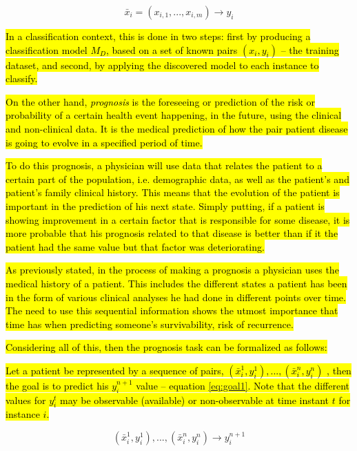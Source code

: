 \begin{equation}
	\bar{x}_i = (x_{i,1},... ,x_{i,m}) \rightarrow y_i
\label{eq:classification}
\end{equation}


\hl{In a classification context, this is done in two steps: first by producing a classification model $M_D$, based on a set of known
 pairs $(x_i, y_i)$ – the training dataset, and second, by applying the discovered model to each instance to classify.}

\hl{On the other hand, \emph{prognosis} is the foreseeing or prediction of the risk or probability of a certain health event happening,
 in the future, using the clinical and non-clinical data. It is the medical prediction of how the pair patient disease is going
 to evolve in a specified period of time.}

\hl{To do this prognosis, a physician will use data that relates the patient to a certain part of the population, i.e. demographic data,
 as well as the patient’s and patient’s family clinical history. This means that the evolution of the patient is important in the
 prediction of his next state. Simply putting, if a patient is showing improvement in a certain factor that is responsible for
 some disease, it is more probable that his prognosis related to that disease is better than if it the patient had the same 
 value but that factor was deteriorating.}

\hl{As previously stated, in the process of making a prognosis a physician uses the medical history of a patient. This includes
 the different states a patient has been in the form of various clinical analyses he had done in different points over time.
 The need to use this sequential information shows the utmost importance that time has when predicting someone’s survivability,
 risk of recurrence.}

\hl{Considering all of this, then the prognosis task can be formalized as follows:}

\hl{Let a patient be represented by a sequence of pairs, $(\bar{x}_i^1,y_i^1 ),...,(\bar{x}_i^n,y_i^n )$ , then the goal is to predict
 his $y_i^{n+1}$ value – equation \ref{eq:goal1}. Note that the different values for $y_i^t$ may be observable (available) or non-observable 
 at time instant $t$ for instance $i$.}


\begin{equation}
	(\bar{x}_i^1,y_i^1 ),...,(\bar{x}_i^n,y_i^n ) \rightarrow y_i^{n+1}
\label{eq:goal1}
\end{equation}


